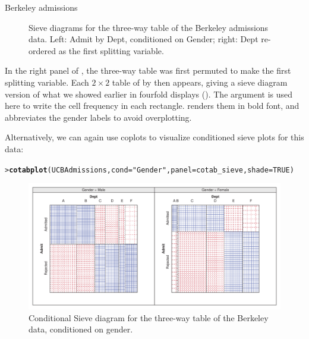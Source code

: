 \documentclass[10pt,krantz2]{krantz}\usepackage[]{graphicx}\usepackage[]{color}
\makeatletter
\newcommand{\hlnum}[1]{\textcolor[rgb]{0.686,0.059,0.569}{#1}}%
\newcommand{\hlstr}[1]{\textcolor[rgb]{0.192,0.494,0.8}{#1}}%
\newcommand{\hlstd}[1]{\textcolor[rgb]{0.345,0.345,0.345}{#1}}%
\newcommand{\hlkwc}[1]{\textcolor[rgb]{0.333,0.667,0.333}{#1}}%
\newcommand{\hlkwd}[1]{\textcolor[rgb]{0.737,0.353,0.396}{\textbf{#1}}}%
\newenvironment{kframe}{%
 \def\at@end@of@kframe{}%
 \ifinner\ifhmode%
  \def\at@end@of@kframe{\end{minipage}}%
  \begin{minipage}{\columnwidth}%
 \fi\fi%
 \def\FrameCommand##1{\hskip\@totalleftmargin \hskip-\fboxsep
 \colorbox{shadecolor}{##1}\hskip-\fboxsep
     \hskip-\linewidth \hskip-\@totalleftmargin \hskip\columnwidth}%
 \MakeFramed {\advance\hsize-\width
   \@totalleftmargin\z@ \linewidth\hsize
   \@setminipage}}%
 {\par\unskip\endMakeFramed%
 \at@end@of@kframe}
\newenvironment{knitrout}{}{} %
\renewenvironment{knitrout}{\small\renewcommand{\baselinestretch}{.85}}{} %
\makeatother
\begin{document}
\begin{Example}[berkeley3]{Berkeley admissions}
\begin{knitrout}
\begin{figure}[!htbp]
\caption[Sieve diagrams for the three-way table of the Berkeley admissions data]{Sieve diagrams for the three-way table of the Berkeley admissions data. Left: Admit by Dept, conditioned on Gender; right: Dept re-ordered as the first splitting variable.\label{fig:berkeley-sieve}}
\end{figure}


\end{knitrout}
In the right panel of , the three-way table
was first permuted to make  the first splitting variable.
Each $2 \times 2$ table of  by  then appears,
giving a sieve diagram version of what we showed earlier in
fourfold displays ().
The  argument is used here to write the cell frequency
in each rectangle.  renders them in bold font, and
 abbreviates the gender labels to avoid overplotting.

Alternatively, we can again use coplots to visualize conditioned sieve
plots for this data:

\begin{knitrout}
\color{fgcolor}\begin{kframe}
\begin{alltt}
\hlstd{> }\hlkwd{cotabplot}\hlstd{(UCBAdmissions,} \hlkwc{cond} \hlstd{=} \hlstr{"Gender"}\hlstd{,} \hlkwc{panel} \hlstd{= cotab_sieve,} \hlkwc{shade} \hlstd{=} \hlnum{TRUE}\hlstd{)}
\end{alltt}
\end{kframe}\begin{figure}[!htbp]

\centerline{\includegraphics[width=\textwidth]{ch04/fig/berkeley-cotabsieve-1} }

\caption[Conditional Sieve diagram for the three-way table of the Berkeley data, conditioned on gender]{Conditional Sieve diagram for the three-way table of the Berkeley data, conditioned on gender.\label{fig:berkeley-cotabsieve}}
\end{figure}



\end{knitrout}
\end{Example}
\end{document}
